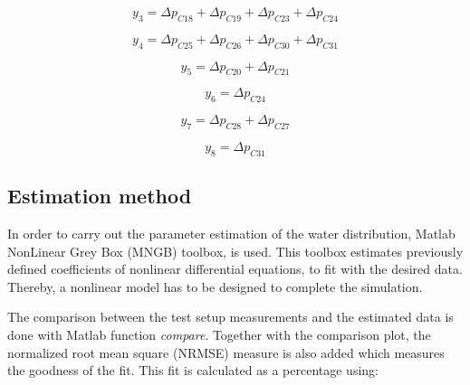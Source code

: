 \vspace{4mm}
\begin {equation}
    y_3 = \Delta p_{C18} + \Delta p_{C19} + \Delta p_{C23} + \Delta p_{C24} 
\end{equation}

\vspace{4mm}
\begin {equation}
    y_4 = \Delta p_{C25} + \Delta p_{C26} + \Delta p_{C30} + \Delta p_{C31}  
\end{equation}

\vspace{4mm}
\begin {equation}
    y_5 = \Delta p_{C20} + \Delta p_{C21}
\end{equation}

\vspace{4mm}
\begin {equation}
    y_6 = \Delta p_{C24} 
\end{equation}

\vspace{4mm}
\begin {equation}
   y_7 = \Delta p_{C28} + \Delta p_{C27}
\end{equation}

\vspace{4mm}
\begin {equation}
   y_8 = \Delta p_{C31} 
\end{equation}

 
\subsection{Estimation method} 
\label{MatlabScript}

In order to carry out the parameter estimation of the water distribution, Matlab NonLinear Grey Box (MNGB) toolbox\cite{MatlabGreyBox}, is used. This toolbox 
estimates previously defined coefficients of nonlinear differential equations, to fit with the desired data. 
Thereby, a nonlinear model has to be designed to complete the simulation. 

The comparison between the test setup measurements and the estimated data is done with Matlab function \textit{compare}. Together with the comparison 
plot, the normalized root mean square (NRMSE) measure is also added which measures the goodness of the fit. This fit is calculated as a percentage \cite{MatlabFit} using:

